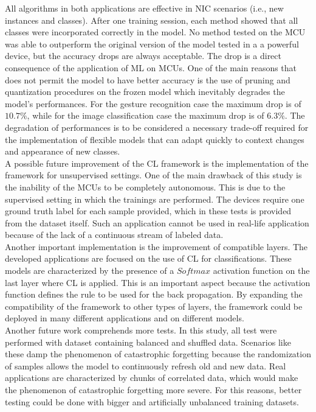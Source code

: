 \documentclass[12pt]{report}
\begin{document}
All algorithms in both applications are effective in NIC scenarios (i.e., new instances and classes). After one training session, each method showed that all classes were incorporated correctly in the model. No method tested on the MCU was able to outperform the original version of the model tested in a a powerful device, but the accuracy drops are always acceptable. The drop is a direct consequence of the application of ML on MCUs. One of the main reasons that does not permit the model to have better accuracy is the use of pruning and quantization procedures on the frozen model which inevitably degrades the model's performances. For the gesture recognition case the maximum drop is of $10.7 \%$, while for the image classification case the maximum drop is of $6.3 \%$. The degradation of performances is to be considered a necessary trade-off required for the implementation of flexible models that can adapt quickly to context changes and appearance of new classes.\\

A possible future improvement of the CL framework is the implementation of the framework for unsupervised settings. One of the main drawback of this study is the inability of the MCUs to be completely autonomous. This is due to the supervised setting in which the trainings are performed. The devices require one ground truth label for each sample provided, which in these tests is provided from the dataset itself. Such an application cannot be used in real-life application because of the lack of a continuous stream of labeled data.\\
Another important implementation is the improvement of compatible layers. The developed applications are focused on the use of CL for classifications. These models are characterized by the presence of a $Softmax$ activation function on the last layer where CL is applied. This is an important aspect because the activation function defines the rule to be used for the back propagation. By expanding the compatibility of the framework to other types of layers, the framework could be deployed in many different applications and on different models.\\
Another future work comprehends more tests. In this study, all test were performed with dataset containing balanced and shuffled data. Scenarios like these damp the phenomenon of catastrophic forgetting because the randomization of samples allows the model to continuously refresh old and new data. Real applications are characterized by chunks of correlated data, which would make the phenomenon of catastrophic forgetting more severe. For this reasons, better testing could be done with bigger and artificially unbalanced training datasets.


\printbibliography
\end{document}
